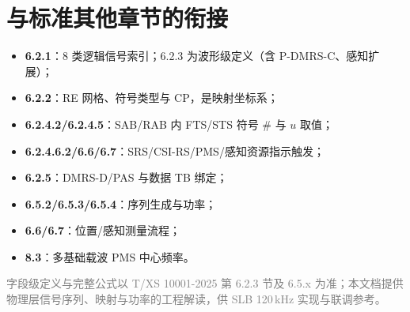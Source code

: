 \documentclass[11pt,a4paper]{ctexart}
\begin{document}
\section{与标准其他章节的衔接}

\begin{itemize}[nosep]
  \item \textbf{6.2.1}：8 类逻辑信号索引；6.2.3 为波形级定义（含 P-DMRS-C、感知扩展）；
  \item \textbf{6.2.2}：RE 网格、符号类型与 CP，是映射坐标系；
  \item \textbf{6.2.4.2/6.2.4.5}：SAB/RAB 内 FTS/STS 符号 \# 与 $u$ 取值；
  \item \textbf{6.2.4.6.2/6.6/6.7}：SRS/CSI-RS/PMS/感知资源指示触发；
  \item \textbf{6.2.5}：DMRS-D/PAS 与数据 TB 绑定；
  \item \textbf{6.5.2/6.5.3/6.5.4}：序列生成与功率；
  \item \textbf{6.6/6.7}：位置/感知测量流程；
  \item \textbf{8.3}：多基础载波 PMS 中心频率。
\end{itemize}

\vfill
\begin{center}
\small\textcolor{gray}{字段级定义与完整公式以 T/XS 10001-2025 第 6.2.3 节及 6.5.x 为准；本文档提供物理层信号序列、映射与功率的工程解读，供 SLB 120\,kHz 实现与联调参考。}
\end{center}
\end{document}
